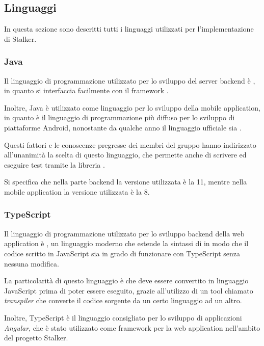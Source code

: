 \documentclass[../../../manuale-manutentore.tex]{subfiles}
\begin{document}
\subsection{Linguaggi}%
\label{sub:linguaggi}
In questa sezione sono descritti tutti i linguaggi utilizzati per l'implementazione di Stalker.

\subsubsection{Java}%
\label{subs:java}

Il linguaggio di programmazione utilizzato per lo sviluppo del server backend è , in quanto si interfaccia facilmente con il framework .

Inoltre, Java è utilizzato come linguaggio per lo sviluppo della mobile application, in quanto è il linguaggio di programmazione più diffuso per lo sviluppo di piattaforme Android, nonostante da qualche anno il linguaggio ufficiale sia .

Questi fattori e le conoscenze pregresse dei membri del gruppo hanno indirizzato all'unanimità la scelta di questo linguaggio, che permette anche di scrivere ed eseguire test tramite la libreria .

Si specifica che nella parte backend la versione utilizzata è la 11, mentre nella mobile application la versione utilizzata è la 8.

\subsubsection{TypeScript}%
\label{subs:typescript}

Il linguaggio di programmazione utilizzato per lo sviluppo backend della web application è , un linguaggio moderno che estende la sintassi di  in modo che il codice scritto in JavaScript sia in grado di funzionare con TypeScript senza nessuna modifica.

La particolarità di questo linguaggio è che deve essere convertito in linguaggio JavaScript prima di poter essere eseguito, grazie all'utilizzo di un tool chiamato \textit{transpiler} che converte il codice sorgente da un certo linguaggio ad un altro.

Inoltre, TypeScript è il linguaggio consigliato per lo sviluppo di applicazioni \textit{Angular}, che è stato utilizzato come framework per la web application nell'ambito del progetto Stalker.
\end{document}
